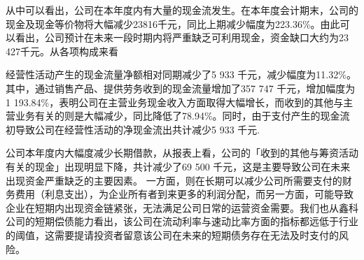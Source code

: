 从中可以看出，公司在本年度内有大量的现金流发生。在本年度会计期末，公司的现金及现金等价物将大幅减少23816千元，同比上期减少幅度为223.36\%。由此可以看出，公司预计在未来一段时期内将严重缺乏可利用现金，资金缺口大约为23 427千元。从各项构成来看
\begin{compactenum}[(1) ]
 \item 经营性活动产生的现金流量净额相对同期减少了5 933 千元，减少幅度为11.32\%。其中，通过销售产品、提供劳务收到的现金流量增加了357 747 
 千元，增加幅度为1 193.84\%，表明公司在主营业务现金收入方面取得大幅增长，而收到的其他与主营业务有关的则是大幅减少，同比降低了78.94\%。同时，由于支付产生的现金流初导致公司在经营性活动的净现金流出共计减少5 933 千元.
 \item 公司本年度内大幅度减少长期借款，从报表上看，公司的「收到的其他与筹资活动有关的现金」出现明显下降，共计减少了69 500 千元，这是主要导致公司在未来出现资金严重缺乏的主要因素。 一方面，则在长期可以减少公司所需要支付的财务费用（利息支出），为企业所有者到来更多的利润分配，而另一方面，可能导致企业在短期内出现资金链紧张，无法满足公司日常的运营资金需要。我们也从鑫科公司的短期偿债能力看出，该公司在流动利率与速动比率方面的指标都远低于行业的阈值，这需要提请投资者留意该公司在未来的短期债务存在无法及时支付的风险。
\end{compactenum}

